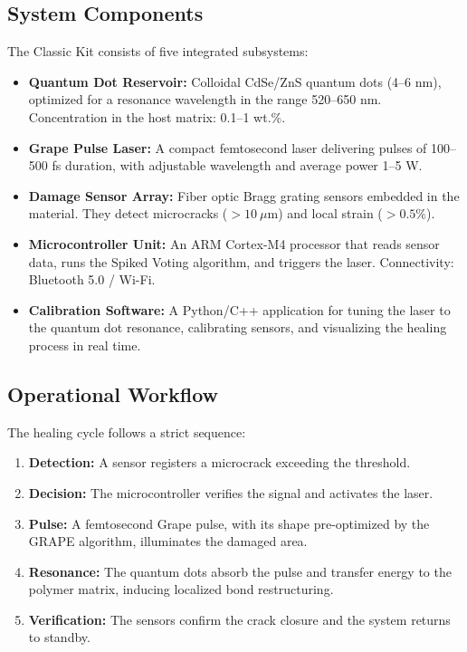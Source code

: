 \documentclass[12pt]{article}
\begin{document}
\subsection{System Components}
The Classic Kit consists of five integrated subsystems:
\begin{itemize}
    \item \textbf{Quantum Dot Reservoir:} Colloidal CdSe/ZnS quantum dots (4--6 nm), optimized for a resonance wavelength in the range 520--650 nm. Concentration in the host matrix: 0.1--1 wt.\%.
    \item \textbf{Grape Pulse Laser:} A compact femtosecond laser delivering pulses of 100--500 fs duration, with adjustable wavelength and average power 1--5 W.
    \item \textbf{Damage Sensor Array:} Fiber optic Bragg grating sensors embedded in the material. They detect microcracks ($>10~\mu$m) and local strain ($>0.5\%$).
    \item \textbf{Microcontroller Unit:} An ARM Cortex-M4 processor that reads sensor data, runs the Spiked Voting algorithm, and triggers the laser. Connectivity: Bluetooth 5.0 / Wi-Fi.
    \item \textbf{Calibration Software:} A Python/C++ application for tuning the laser to the quantum dot resonance, calibrating sensors, and visualizing the healing process in real time.
\end{itemize}

\subsection{Operational Workflow}
The healing cycle follows a strict sequence:
\begin{enumerate}
    \item \textbf{Detection:} A sensor registers a microcrack exceeding the threshold.
    \item \textbf{Decision:} The microcontroller verifies the signal and activates the laser.
    \item \textbf{Pulse:} A femtosecond Grape pulse, with its shape pre-optimized by the GRAPE algorithm, illuminates the damaged area.
    \item \textbf{Resonance:} The quantum dots absorb the pulse and transfer energy to the polymer matrix, inducing localized bond restructuring.
    \item \textbf{Verification:} The sensors confirm the crack closure and the system returns to standby.
\end{enumerate}
\end{document}
